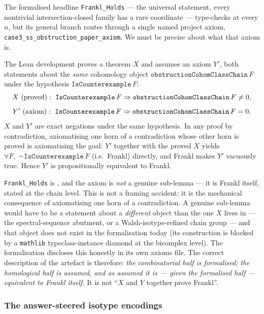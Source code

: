 The formalised headline \texttt{Frankl\_Holds} --- the universal
statement, every nontrivial intersection-closed family has a rare
coordinate --- type-checks at every $n$, but its general branch routes
through a single named project axiom,
\texttt{case3\_ss\_obstruction\_paper\_axiom}. We must be precise about
what that axiom is.

\begin{proposition}
\label{prop:axiom-is-frankl}
The Lean development proves a theorem $X$ and assumes an axiom $Y'$,
both statements about the \emph{same} cohomology object
$\texttt{obstructionCohomClassChain}\,F$ under the hypothesis
$\texttt{IsCounterexample}\,F$:
\[
  X\ \textup{(proved)}:\ \texttt{IsCounterexample}\,F\Rightarrow
  \texttt{obstructionCohomClassChain}\,F\neq0,
\]
\[
  Y'\ \textup{(axiom)}:\ \texttt{IsCounterexample}\,F\Rightarrow
  \texttt{obstructionCohomClassChain}\,F=0.
\]
$X$ and $Y'$ are exact negations under the same hypothesis. In any
proof by contradiction, axiomatising one horn of a contradiction whose
other horn is proved is axiomatising the goal: $Y'$ together with the
proved $X$ yields $\forall F,\ \neg\,\texttt{IsCounterexample}\,F$
\textup(i.e.\ Frankl\textup) directly, and Frankl makes $Y'$ vacuously
true. Hence $Y'$ is propositionally equivalent to Frankl.
\end{proposition}

\begin{status}
\texttt{Frankl\_Holds} is , and the axiom is
\emph{not} a genuine sub-lemma --- it is Frankl itself, stated at the
chain level. This is not a framing accident: it is the mechanical
consequence of axiomatising one horn of a contradiction. A genuine
sub-lemma would have to be a statement about a \emph{different} object
than the one $X$ lives in --- the spectral-sequence abutment, or a
Walsh-isotype-refined chain group --- and that object does not exist in
the formalisation today (its construction is blocked by a
\texttt{mathlib} typeclass-instance diamond at the bicomplex level).
The formalisation discloses this honestly in its own axioms file. The
correct description of the artefact is therefore: \emph{the
combinatorial half is formalised; the homological half is assumed, and
as assumed it is --- given the formalised half --- equivalent to Frankl
itself.} It is not ``$X$ and $Y$ together prove Frankl''.
\end{status}

\subsubsection{The answer-steered isotype encodings}
\label{ssec:answer-steered}

